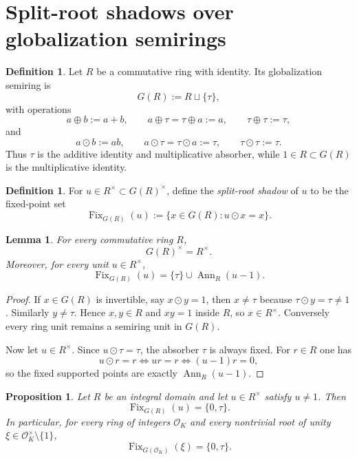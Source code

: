 \documentclass[11pt,a4paper]{article}
\newtheorem{proposition}[theorem]{Proposition}
\newtheorem{lemma}[theorem]{Lemma}
\theoremstyle{definition}
\newtheorem{definition}[theorem]{Definition}
\theoremstyle{remark}
\DeclareMathOperator{\Fix}{Fix}
\DeclareMathOperator{\Ann}{Ann}
\newcommand{\taup}{\tau}
\begin{document}
\section{Split-root shadows over globalization semirings}

\begin{definition}
Let $R$ be a commutative ring with identity.  Its globalization semiring is
\[
G(R):=R\sqcup\{\taup\},
\]
with operations
\[
a\oplus b:=a+b,
\qquad a\oplus \taup=\taup\oplus a:=a,
\qquad \taup\oplus\taup:=\taup,
\]
and
\[
a\odot b:=ab,
\qquad a\odot \taup=\taup\odot a:=\taup,
\qquad \taup\odot\taup:=\taup.
\]
Thus $\taup$ is the additive identity and multiplicative absorber, while $1\in R\subset G(R)$ is the multiplicative identity.
\end{definition}

\begin{definition}
For $u\in R^\times\subset G(R)^\times$, define the \emph{split-root shadow} of $u$ to be the fixed-point set
\[
\Fix_{G(R)}(u):=\{x\in G(R):u\odot x=x\}.
\]
\end{definition}

\begin{lemma}\label{lem:units-fix}
For every commutative ring $R$,
\[
G(R)^\times=R^\times.
\]
Moreover, for every unit $u\in R^\times$,
\[
\Fix_{G(R)}(u)=\{\taup\}\cup \Ann_R(u-1).
\]
\end{lemma}

\begin{proof}
If $x\in G(R)$ is invertible, say $x\odot y=1$, then $x\neq \taup$ because $\taup\odot y=\taup\neq1$.  Similarly $y\neq\taup$.  Hence $x,y\in R$ and $xy=1$ inside $R$, so $x\in R^\times$.  Conversely every ring unit remains a semiring unit in $G(R)$.

Now let $u\in R^\times$.  Since $u\odot \taup=\taup$, the absorber $\taup$ is always fixed.  For $r\in R$ one has
\[
u\odot r=r \iff ur=r \iff (u-1)r=0,
\]
so the fixed supported points are exactly $\Ann_R(u-1)$.
\end{proof}

\begin{proposition}\label{prop:general-fixed}
Let $R$ be an integral domain and let $u\in R^\times$ satisfy $u\neq1$.  Then
\[
\Fix_{G(R)}(u)=\{0,\taup\}.
\]
In particular, for every ring of integers $\mathcal O_K$ and every nontrivial root of unity $\xi\in\mathcal O_K^\times\setminus\{1\}$,
\[
\Fix_{G(\mathcal O_K)}(\xi)=\{0,\taup\}.
\]
\end{proposition}
\end{document}
